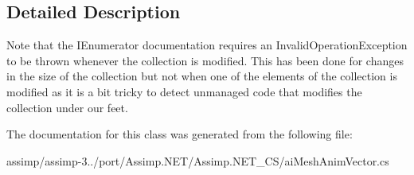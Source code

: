 \subsection{Detailed Description}
Note that the I\+Enumerator documentation requires an Invalid\+Operation\+Exception to be thrown whenever the collection is modified. This has been done for changes in the size of the collection but not when one of the elements of the collection is modified as it is a bit tricky to detect unmanaged code that modifies the collection under our feet. 

The documentation for this class was generated from the following file\+:\begin{DoxyCompactItemize}
\item 
assimp/assimp-\/3../port/\+Assimp.\+N\+E\+T/\+Assimp.\+N\+E\+T\+\_\+\+C\+S/ai\+Mesh\+Anim\+Vector.\+cs\end{DoxyCompactItemize}
